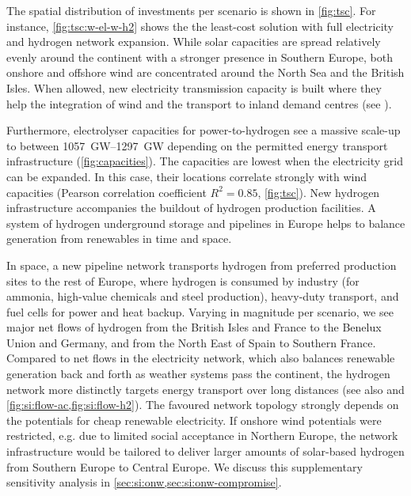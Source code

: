 The spatial distribution of investments per scenario is shown in \cref{fig:tsc}.
For instance, \cref{fig:tsc:w-el-w-h2} shows the the least-cost solution with
full electricity and hydrogen network expansion. While solar capacities are
spread relatively evenly around the continent with a stronger presence in
Southern Europe, both onshore and offshore wind are concentrated around the
North Sea and the British Isles. When allowed, new electricity transmission
capacity is built where they help the integration of wind and the transport to
inland demand centres (see ).

Furthermore, electrolyser capacities for power-to-hydrogen see a massive
scale-up to between \SIrange{1057}{1297}{\giga\watt} depending on the permitted
energy transport infrastructure (\cref{fig:capacities}). The capacities are
lowest when the electricity grid can be expanded. In this case, their locations
correlate strongly with wind capacities (Pearson correlation coefficient
$R^2=0.85$, \cref{fig:tsc}). New hydrogen infrastructure accompanies the
buildout of hydrogen production facilities. A system of hydrogen underground
storage and pipelines in Europe helps to balance generation from renewables in
time and space.

In space, a new pipeline network transports hydrogen from preferred production
sites to the rest of Europe, where hydrogen is consumed by industry (for
ammonia, high-value chemicals and steel production), heavy-duty transport, and
fuel cells for power and heat backup. Varying in magnitude per scenario, we see
major net flows of hydrogen from the British Isles and France to the Benelux
Union and Germany, and from the North East of Spain to Southern France. Compared
to net flows in the electricity network, which also balances renewable
generation back and forth as weather systems pass the continent, the hydrogen
network more distinctly targets energy transport over long distances (see also
 and \cref{fig:si:flow-ac,fig:si:flow-h2}). The
favoured network topology strongly depends on the potentials for cheap renewable
electricity. If onshore wind potentials were restricted, e.g. due to limited
social acceptance in Northern Europe, the network infrastructure would be
tailored to deliver larger amounts of solar-based hydrogen from Southern Europe
to Central Europe. We discuss this supplementary sensitivity analysis in
\cref{sec:si:onw,sec:si:onw-compromise}.

